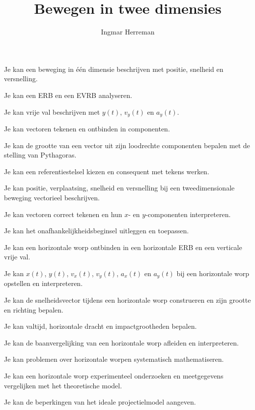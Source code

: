 \documentclass{ximera}
\title{Bewegen in twee dimensies}
\author{Ingmar Herreman}
\begin{document}





\maketitle


\begin{voorkennis}
  \item Je kan een beweging in één dimensie beschrijven met positie,
        snelheid en versnelling.
  \item Je kan een ERB en een EVRB analyseren.
  \item Je kan vrije val beschrijven met $y(t)$, $v_y(t)$ en $a_y(t)$.
  \item Je kan vectoren tekenen en ontbinden in componenten.
  \item Je kan de grootte van een vector uit zijn loodrechte componenten
        bepalen met de stelling van Pythagoras.
  \item Je kan een referentiestelsel kiezen en consequent met tekens werken.
\end{voorkennis}

\begin{leerdoelen}
  \item Je kan positie, verplaatsing, snelheid en versnelling bij een
        tweedimensionale beweging vectorieel beschrijven.
  \item Je kan vectoren correct tekenen en hun $x$- en $y$-componenten
        interpreteren.
  \item Je kan het onafhankelijkheidsbeginsel uitleggen en toepassen.
  \item Je kan een horizontale worp ontbinden in een horizontale ERB en
        een verticale vrije val.
  \item Je kan $x(t)$, $y(t)$, $v_x(t)$, $v_y(t)$, $a_x(t)$ en $a_y(t)$
        bij een horizontale worp opstellen en interpreteren.
  \item Je kan de snelheidsvector tijdens een horizontale worp construeren
        en zijn grootte en richting bepalen.
  \item Je kan valtijd, horizontale dracht en impactgrootheden bepalen.
  \item Je kan de baanvergelijking van een horizontale worp afleiden en
        interpreteren.
  \item Je kan problemen over horizontale worpen systematisch mathematiseren.
  \item Je kan een horizontale worp experimenteel onderzoeken en meetgegevens
        vergelijken met het theoretische model.
  \item Je kan de beperkingen van het ideale projectielmodel aangeven.
\end{leerdoelen}
\end{document}

